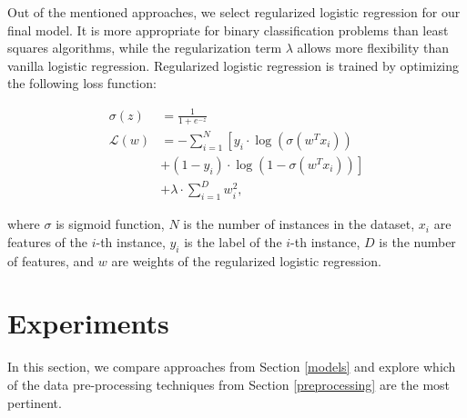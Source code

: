 Out of the mentioned approaches, we select regularized logistic regression for our final model. It is more appropriate for binary classification problems than least squares algorithms, while the regularization term $\lambda$ allows more flexibility than vanilla logistic regression. Regularized logistic regression is trained by optimizing the following loss function:

\begin{align}
    \sigma(z) &= \frac{1}{1 + e^{-z}} \\
    \mathcal{L}(w) &= -\sum_{i=1}^{N} \left[ y_i \cdot \log(\sigma(w^Tx_i)) \right. \\
                   & \left. + (1 - y_i) \cdot \log(1 - \sigma(w^Tx_i)) \right] \\
                   & + \lambda \cdot \sum_{i=1}^{D} w_i^2,
\end{align}

\noindent
where $\sigma$ is sigmoid function, $N$ is the number of instances in the dataset, $x_i$ are features of the $i$-th instance, $y_i$ is the label of the $i$-th instance, $D$ is the number of features, and $w$ are weights of the regularized logistic regression.









\section{Experiments}
\label{experiments}

In this section, we compare approaches from Section \ref{models} and explore which of the data pre-processing techniques from Section \ref{preprocessing} are the most pertinent.


